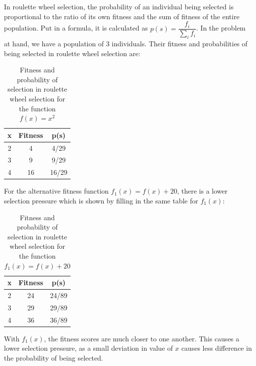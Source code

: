 \documentclass{article}
\begin{document}
In roulette wheel selection, the probability of an individual being selected is proportional to the ratio of its own fitness and the sum of fitness of the entire population. Put in a formula, it is calculated as $p(s) = \dfrac{f_i}{\sum_i f_i}$. In the problem at hand, we have a population of 3 individuals. Their fitness and probabilities of being selected in roulette wheel selection are: \\
\begin{table}[]
    \centering
    \begin{tabular}{c|c|c}
    x    & Fitness  & p(s) \\ \hline \hline
    2    &  4       & 4/29 \\ \hline
    3    &  9       & 9/29 \\ \hline
    4    &  16      & 16/29 \\    
    \end{tabular}
    \caption{Fitness and probability of selection in roulette wheel selection for the function $f(x)=x^2$}
\end{table}

For the alternative fitness function $f_1 (x) = f (x) + 20$, there is a lower selection pressure which is shown by filling in the same table for $f_1(x)$:
\begin{table}[]
    \centering
    \begin{tabular}{c|c|c}
    x    & Fitness  & p(s) \\ \hline \hline
    2    &  24      & 24/89 \\ \hline
    3    &  29      & 29/89\\ \hline
    4    &  36      & 36/89 \\    
    \end{tabular}
    \caption{Fitness and probability of selection in roulette wheel selection for the function $f_1(x)=f(x)+20$}
\end{table}
With $f_1(x)$, the fitness scores are much closer to one another. This causes a lower selection pressure, as a small deviation in value of $x$ causes less difference in the probability of being selected.

\end{document}
